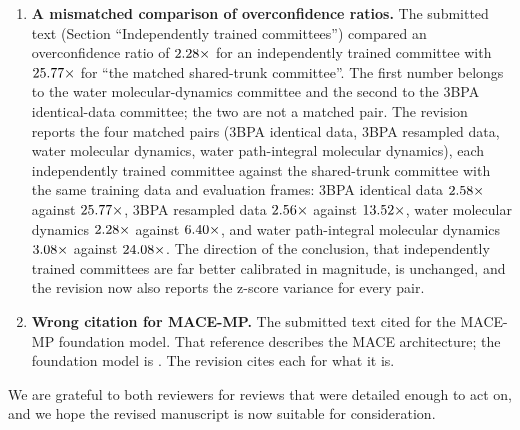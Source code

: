 \documentclass[11pt]{article}
\begin{document}
\begin{enumerate}
\item \textbf{A mismatched comparison of overconfidence ratios.} The submitted
  text (Section ``Independently trained committees'') compared an
  overconfidence ratio of $2.28\times$ for an independently
  trained committee with $25.77\times$ for ``the matched
  shared-trunk committee''. The first number belongs to the water
  molecular-dynamics committee and the second to the 3BPA identical-data
  committee; the two are not a matched pair. The revision reports the four
  matched pairs (3BPA identical data, 3BPA resampled data, water molecular
  dynamics, water path-integral molecular dynamics), each independently
  trained committee against the shared-trunk committee with the same training
  data and evaluation frames: 3BPA identical data
  $2.58\times$ against $25.77\times$, 3BPA
  resampled data $2.56\times$ against
  $13.52\times$, water molecular dynamics
  $2.28\times$ against $6.40\times$,
  and water path-integral molecular dynamics
  $3.08\times$ against
  $24.08\times$. The direction of the conclusion, that independently trained
  committees are far better calibrated in magnitude, is unchanged, and the
  revision now also reports the z-score variance for every pair.
\item \textbf{Wrong citation for MACE-MP.} The submitted text cited
  \citet{batatia2022mace} for the MACE-MP foundation model. That reference
  describes the MACE architecture; the foundation model is
  \citet{batatia2023foundation}. The revision cites each for what it is.
\end{enumerate}

\medskip\noindent
We are grateful to both reviewers for reviews that were detailed enough to act
on, and we hope the revised manuscript is now suitable for consideration.



\end{document}
